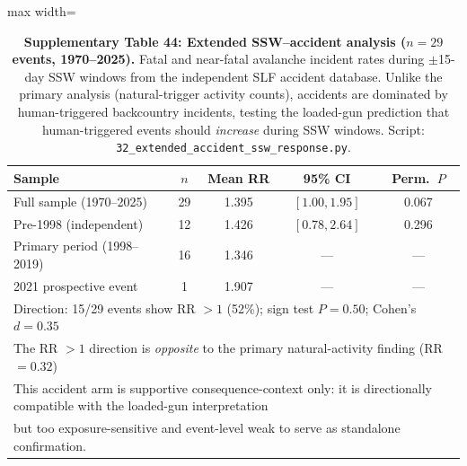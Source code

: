 \documentclass[11pt,letterpaper]{article}
\begin{document}

\begin{table}[!ht]
\centering
\caption{\textbf{Supplementary Table 44: Extended SSW--accident analysis ($n = 29$ events, 1970--2025).} Fatal and near-fatal avalanche incident rates during $\pm$15-day SSW windows from the independent SLF accident database. Unlike the primary analysis (natural-trigger activity counts), accidents are dominated by human-triggered backcountry incidents, testing the loaded-gun prediction that human-triggered events should \emph{increase} during SSW windows. Script: \texttt{32\_extended\_accident\_ssw\_response.py}.}
\label{tab:accident_extended}
\small
\begin{adjustbox}{max width=\textwidth}
\begin{tabular}{lcccc}
\toprule
Sample & $n$ & Mean RR & 95\% CI & Perm.\ $P$ \\
\midrule
Full sample (1970--2025) & 29 & 1.395 & $[1.00, 1.95]$ & 0.067 \\
Pre-1998 (independent) & 12 & 1.426 & $[0.78, 2.64]$ & 0.296 \\
Primary period (1998--2019) & 16 & 1.346 & --- & --- \\
2021 prospective event & 1 & 1.907 & --- & --- \\
\midrule
\multicolumn{5}{l}{\footnotesize Direction: 15/29 events show RR $> 1$ (52\%); sign test $P = 0.50$; Cohen's $d = 0.35$} \\
\multicolumn{5}{l}{\footnotesize The RR $> 1$ direction is \emph{opposite} to the primary natural-activity finding (RR $= 0.32$)} \\
\multicolumn{5}{l}{\footnotesize This accident arm is supportive consequence-context only: it is directionally compatible with the loaded-gun interpretation} \\
\multicolumn{5}{l}{\footnotesize but too exposure-sensitive and event-level weak to serve as standalone confirmation.} \\
\bottomrule
\end{tabular}
\end{adjustbox}
\end{table}
\end{document}
